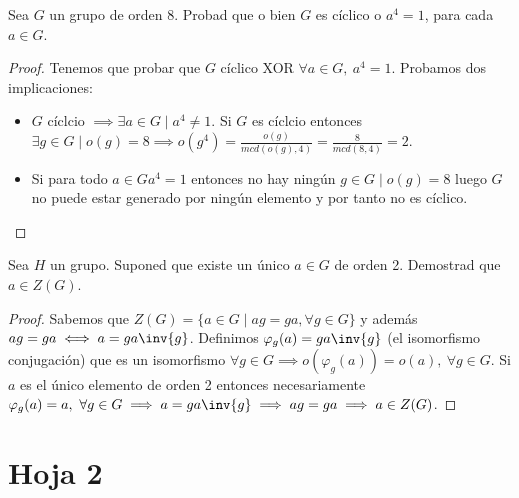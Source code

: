 \begin{ex}[H1.31]
	Sea $G$ un grupo de orden 8. Probad que o bien $G$ es cíclico o $a^4 = 1$, para cada $a \in G$.
\end{ex}

\begin{proof}
	Tenemos que probar que $G$ cíclico XOR $\forall a \in G,\ a^4 = 1$. Probamos dos implicaciones:
	\begin{itemize}
		\item $G$ cíclcio $\implies \exists a \in G \mid a^4 \neq 1$. Si $G$ es cíclcio entonces $\exists g \in G \mid o(g) = 8 \implies o(g^4) = \frac{o(g)}{mcd(o(g), 4)} = \frac{8}{mcd(8,4)} = 2$.
		\item Si para todo $a \in G a^4 = 1$ entonces no hay ningún $g \in G \mid o(g) = 8$ luego $G$ no puede estar generado por ningún elemento y por tanto no es cíclico.
	\end{itemize}
\end{proof}

\begin{ex}[H1.33]
	Sea $H$ un grupo. Suponed que existe un único $a\in G$ de orden 2. Demostrad que $a \in Z(G)$.
\end{ex}

\begin{proof}
	Sabemos que $Z(G) = \{a \in G\mid ag = ga, \forall g \in G\}$ y además $ag = ga \iff a = ga\inv{g}$. Definimos $\varphi_g(a) = ga\inv{g}$ (el isomorfismo conjugación) que es un isomorfismo $\forall g \in G \implies o(\varphi_g(a)) = o(a),\ \forall g \in G$. Si $a$ es el único elemento de orden 2 entonces necesariamente $\varphi_g(a) = a,\ \forall g\in G \implies a = ga\inv{g} \implies ag = ga \implies a \in Z(G)$.
\end{proof}

\section{Hoja 2}


